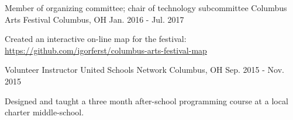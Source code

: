 

\begin{cventries}

  \cventry
    {Member of organizing committee; chair of technology subcommittee} %
    {Columbus Arts Festival} %
    {Columbus, OH} %
    {Jan. 2016 - Jul. 2017} %
    {
      \begin{cvitems} %
        \item {Created an interactive on-line map for the festival: \url{https://github.com/igorferst/columbus-arts-festival-map}}
      \end{cvitems}
    }

  \cventry
    {Volunteer Instructor} %
    {United Schools Network} %
    {Columbus, OH} %
    {Sep. 2015 - Nov. 2015} %
    {
      \begin{cvitems} %
        \item {Designed and taught a three month after-school programming course at a local charter middle-school.}
      \end{cvitems}
    }

\end{cventries}
